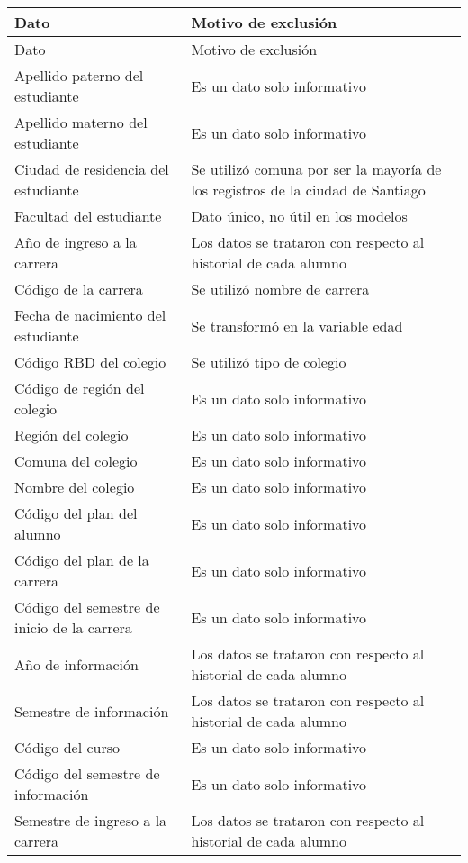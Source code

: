 \begin{longtable}{| p{5cm}| p{7cm} |}
	\hline
	Dato & Motivo de exclusión\\
	\hline \hline
	\endfirsthead
	
	\hline
	Dato & Motivo de exclusión\\
	\hline \hline
	\endhead
	Apellido paterno del estudiante & Es un dato solo informativo	\\ \hline			
	Apellido materno del estudiante & Es un dato solo informativo  \\ \hline
	Ciudad de residencia del estudiante & Se utilizó comuna por ser la mayoría de los registros de la ciudad de Santiago\\ \hline
	Facultad del estudiante & Dato único, no útil en los modelos\\ \hline
	Año de ingreso a la carrera & Los datos se trataron con respecto al historial de cada alumno	\\ \hline
	Código de la carrera & Se utilizó nombre de carrera	\\ \hline
	Fecha de nacimiento del estudiante & Se transformó en la variable edad	\\ \hline
	Código RBD del colegio & Se utilizó tipo de colegio \\ \hline
	Código de región del colegio & Es un dato solo informativo	\\ \hline
	Región del colegio & Es un dato solo informativo	\\ \hline
	Comuna del colegio & Es un dato solo informativo	\\ \hline
	Nombre del colegio & Es un dato solo informativo	\\ \hline
	Código del plan del alumno & Es un dato solo informativo	\\ \hline
	Código del plan de la carrera & Es un dato solo informativo	\\ \hline
	Código del semestre de inicio de la carrera & Es un dato solo informativo	\\ \hline
	Año de información & Los datos se trataron con respecto al historial de cada alumno	\\ \hline
	Semestre de información & Los datos se trataron con respecto al historial de cada alumno	\\ \hline
	Código del curso & Es un dato solo informativo	\\ \hline
	Código del semestre de información & Es un dato solo informativo	\\ \hline
	Semestre de ingreso a la carrera & Los datos se trataron con respecto al historial de cada alumno	\\ \hline

\end{longtable}
